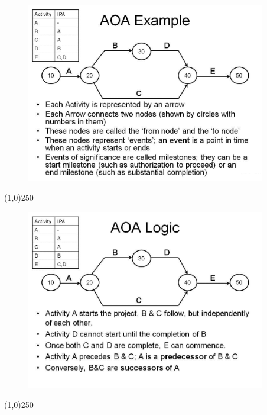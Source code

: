 \begin{frame}
\begin{figure}
	\centering
		\includegraphics[width = 10.5cm]{oldnotes/Slide47.jpg}
\end{figure}
\end{frame}
\begin{center}\line(1,0){250}\end{center}





\begin{frame}
\begin{figure}
	\centering
		\includegraphics[width = 10.5cm]{oldnotes/Slide48.jpg}
\end{figure}
\end{frame}
\begin{center}\line(1,0){250}\end{center}





